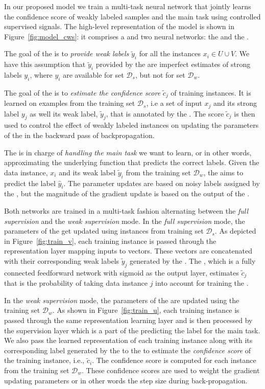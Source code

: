 In our proposed model we train a multi-task neural network that jointly learns the confidence score of weakly labeled samples and the main task using controlled supervised signals.
%
The high-level representation of the model is shown in Figure~\ref{fig:model_cws}: it comprises a \wa and two neural networks: the \cnet and the \tnet. 

The goal of the \wa is to \emph{provide weak labels} $\tilde{y}_i$ for all the instances $x_i \in U \cup V$. We have this assumption that $\tilde{y}_i$ provided by the \wa are imperfect estimates of strong labels $y_i$, where $y_i$ are available for set $\mathcal{D}_s$, but not for set $\mathcal{D}_w$.

The goal of the \cnet is to \emph{estimate the confidence score} $\tilde{c}_j$ of training instances. It is learned on examples from the training set $\mathcal{D}_s$, i.e a set of input $x_j$ and its strong label $y_j$ as well its weak label,  $\tilde{y}_j$,  that is annotated by the \wa.
The score $\tilde{c}_j$ is then used to control the effect of weakly labeled instances on updating the parameters of the \tnet in the backward pass of backpropagation.

The \tnet is in charge of \emph{handling the main task} we want to learn, or in other words, approximating the underlying function that predicts the correct labels. 
Given the data instance, $x_i$ and its weak label $\tilde{y}_i$ from the training set $\mathcal{D}_w$, the \tnet aims to predict the label $\hat{y}_i$. 
The \tnet parameter updates are based on noisy labels assigned by the \wa, but the magnitude of the gradient update is based on the output of the \cnet. 

Both networks are trained in a multi-task fashion alternating between the \emph{full supervision} and the \emph{weak supervision} mode.  
In the \emph{full supervision} mode, the parameters of the \cnet get updated using instances from training set $\mathcal{D}_s$.  
As depicted in Figure~\ref{fig:train_v}, each training instance is passed through the representation layer mapping inputs to vectors. These vectors are concatenated with their corresponding weak labels $\tilde{y}_j$ generated by the \wa.
The \cnet, which is a fully connected feedforward network with sigmoid as the output layer, estimates $\tilde{c}_j$ that is the probability of taking data instance $j$ into account for training the \tnet.

In the \emph{weak supervision} mode, the parameters of the \tnet are updated using the training set $\mathcal{D}_w$.
As shown in Figure~\ref{fig:train_u}, each training instance is passed through the same representation learning layer and is then processed by the supervision layer which is a part of the \tnet predicting the label for the main task. 
%
We also pass the learned representation of each training instance along with its corresponding label generated by the \wa to the \cnet to estimate the \emph{confidence score} of the training instance, i.e., $\tilde{c}_i$. 
The confidence score is computed for each instance from the training set $\mathcal{D}_w$. These confidence scores are used to weight the gradient updating \tnet parameters or in other words the step size during back-propagation. 

